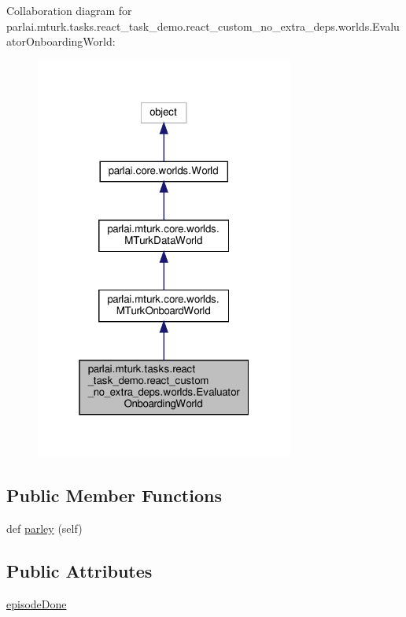 Collaboration diagram for parlai.\+mturk.\+tasks.\+react\+\_\+task\+\_\+demo.\+react\+\_\+custom\+\_\+no\+\_\+extra\+\_\+deps.\+worlds.\+Evaluator\+Onboarding\+World\+:
\nopagebreak
\begin{figure}[H]
\begin{center}
\leavevmode
\includegraphics[width=241pt]{classparlai_1_1mturk_1_1tasks_1_1react__task__demo_1_1react__custom__no__extra__deps_1_1worlds_1e92463d91ec1008b8ca2375029d3be38}
\end{center}
\end{figure}
\subsection*{Public Member Functions}
\begin{DoxyCompactItemize}
\item 
def \hyperlink{classparlai_1_1mturk_1_1tasks_1_1react__task__demo_1_1react__custom__no__extra__deps_1_1worlds_1_1EvaluatorOnboardingWorld_a2002afa1de9c5782c6e26f75a78ff8d8}{parley} (self)
\end{DoxyCompactItemize}
\subsection*{Public Attributes}
\begin{DoxyCompactItemize}
\item 
\hyperlink{classparlai_1_1mturk_1_1tasks_1_1react__task__demo_1_1react__custom__no__extra__deps_1_1worlds_1_1EvaluatorOnboardingWorld_a18ad4406ab6515684a860c6337d78351}{episode\+Done}
\end{DoxyCompactItemize}



